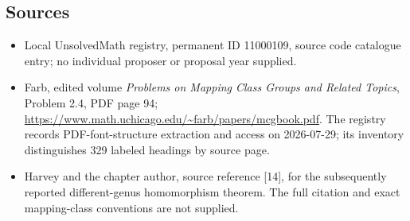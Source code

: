 \documentclass[11pt]{article}
\begin{document}
\subsection{Sources}
\begin{itemize}
\item Local UnsolvedMath registry, permanent ID 11000109, source code catalogue entry; no individual proposer or proposal year supplied.
\item Farb, edited volume \emph{Problems on Mapping Class Groups and Related Topics}, Problem 2.4, PDF page 94; \url{https://www.math.uchicago.edu/~farb/papers/mcgbook.pdf}. The registry records PDF-font-structure extraction and access on 2026-07-29; its inventory distinguishes 329 labeled headings by source page.
\item Harvey and the chapter author, source reference [14], for the subsequently reported different-genus homomorphism theorem. The full citation and exact mapping-class conventions are not supplied.
\end{itemize}
\end{document}
